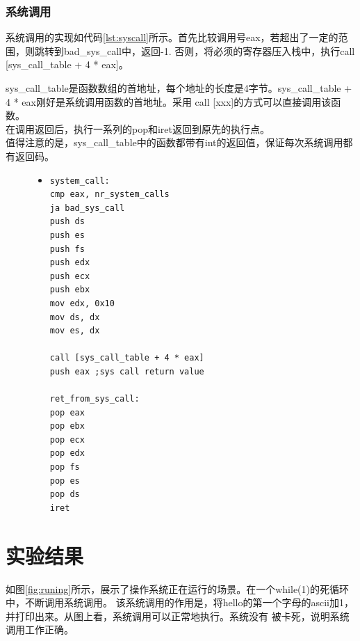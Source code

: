 \documentclass[a4paper]{article}
\begin{document}
    \subsubsection{系统调用}
    系统调用的实现如代码\ref{lst:syscall}所示。首先比较调用号eax，若超出了一定的范围，则跳转到bad\_sys\_call中，返回-1.
    否则，将必须的寄存器压入栈中，执行call [sys\_call\_table + 4 * eax]。\ 

    sys\_call\_table是函数数组的首地址，每个地址的长度是4字节。sys\_call\_table + 4 * eax刚好是系统调用函数的首地址。采用
    call [xxx]的方式可以直接调用该函数。\\ 

    在调用返回后，执行一系列的pop和iret返回到原先的执行点。\\ 

    值得注意的是，sys\_call\_table中的函数都带有int的返回值，保证每次系统调用都有返回码。

    \begin{figure}[!hbt]
    \begin{itemize}
    \item[] \begin{lstlisting}[language={[x86masm]Assembler}, label=lst:syscall, caption=系统调用的实现]
system_call:
cmp eax, nr_system_calls
ja bad_sys_call
push ds
push es 
push fs
push edx
push ecx
push ebx
mov edx, 0x10
mov ds, dx
mov es, dx

call [sys_call_table + 4 * eax] 
push eax ;sys call return value

ret_from_sys_call:
pop eax
pop ebx
pop ecx
pop edx
pop fs
pop es
pop ds
iret
    \end{lstlisting}
    \end{itemize}
    \end{figure}
\section{实验结果}
如图\ref{fig:runing}所示，展示了操作系统正在运行的场景。在一个while(1)的死循环中，不断调用系统调用。
该系统调用的作用是，将hello的第一个字母的ascii加1，并打印出来。从图上看，系统调用可以正常地执行。系统没有
被卡死，说明系统调用工作正确。\\ 
\end{document}

